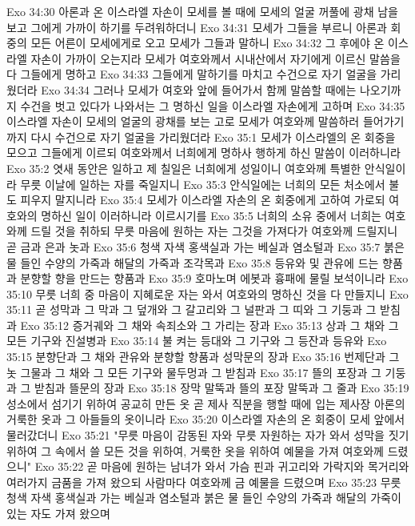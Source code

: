 Exo 34:30  아론과 온 이스라엘 자손이 모세를 볼 때에 모세의 얼굴 꺼풀에 광채 남을 보고 그에게 가까이 하기를 두려워하더니
Exo 34:31  모세가 그들을 부르니 아론과 회중의 모든 어른이 모세에게로 오고 모세가 그들과 말하니
Exo 34:32  그 후에야 온 이스라엘 자손이 가까이 오는지라 모세가 여호와께서 시내산에서 자기에게 이르신 말씀을 다 그들에게 명하고
Exo 34:33  그들에게 말하기를 마치고 수건으로 자기 얼굴을 가리웠더라
Exo 34:34  그러나 모세가 여호와 앞에 들어가서 함께 말씀할 때에는 나오기까지 수건을 벗고 있다가 나와서는 그 명하신 일을 이스라엘 자손에게 고하며
Exo 34:35  이스라엘 자손이 모세의 얼굴의 광채를 보는 고로 모세가 여호와께 말씀하러 들어가기까지 다시 수건으로 자기 얼굴을 가리웠더라
Exo 35:1  모세가 이스라엘의 온 회중을 모으고 그들에게 이르되 여호와께서 너희에게 명하사 행하게 하신 말씀이 이러하니라
Exo 35:2  엿새 동안은 일하고 제 칠일은 너희에게 성일이니 여호와께 특별한 안식일이라 무릇 이날에 일하는 자를 죽일지니
Exo 35:3  안식일에는 너희의 모든 처소에서 불도 피우지 말지니라
Exo 35:4  모세가 이스라엘 자손의 온 회중에게 고하여 가로되 여호와의 명하신 일이 이러하니라 이르시기를
Exo 35:5  너희의 소유 중에서 너희는 여호와께 드릴 것을 취하되 무릇 마음에 원하는 자는 그것을 가져다가 여호와께 드릴지니 곧 금과 은과 놋과
Exo 35:6  청색 자색 홍색실과 가는 베실과 염소털과
Exo 35:7  붉은 물 들인 수양의 가죽과 해달의 가죽과 조각목과
Exo 35:8  등유와 및 관유에 드는 향품과 분향할 향을 만드는 향품과
Exo 35:9  호마노며 에봇과 흉패에 물릴 보석이니라
Exo 35:10  무릇 너희 중 마음이 지혜로운 자는 와서 여호와의 명하신 것을 다 만들지니
Exo 35:11  곧 성막과 그 막과 그 덮개와 그 갈고리와 그 널판과 그 띠와 그 기둥과 그 받침과
Exo 35:12  증거궤와 그 채와 속죄소와 그 가리는 장과
Exo 35:13  상과 그 채와 그 모든 기구와 진설병과
Exo 35:14  불 켜는 등대와 그 기구와 그 등잔과 등유와
Exo 35:15  분향단과 그 채와 관유와 분향할 향품과 성막문의 장과
Exo 35:16  번제단과 그 놋 그물과 그 채와 그 모든 기구와 물두멍과 그 받침과
Exo 35:17  뜰의 포장과 그 기둥과 그 받침과 뜰문의 장과
Exo 35:18  장막 말뚝과 뜰의 포장 말뚝과 그 줄과
Exo 35:19  성소에서 섬기기 위하여 공교히 만든 옷 곧 제사 직분을 행할 때에 입는 제사장 아론의 거룩한 옷과 그 아들들의 옷이니라
Exo 35:20  이스라엘 자손의 온 회중이 모세 앞에서 물러갔더니
Exo 35:21  "무릇 마음이 감동된 자와 무릇 자원하는 자가 와서 성막을 짓기 위하여 그 속에서 쓸 모든 것을 위하여, 거룩한 옷을 위하여 예물을 가져 여호와께 드렸으니"
Exo 35:22  곧 마음에 원하는 남녀가 와서 가슴 핀과 귀고리와 가락지와 목거리와 여러가지 금품을 가져 왔으되 사람마다 여호와께 금 예물을 드렸으며
Exo 35:23  무릇 청색 자색 홍색실과 가는 베실과 염소털과 붉은 물 들인 수양의 가죽과 해달의 가죽이 있는 자도 가져 왔으며
